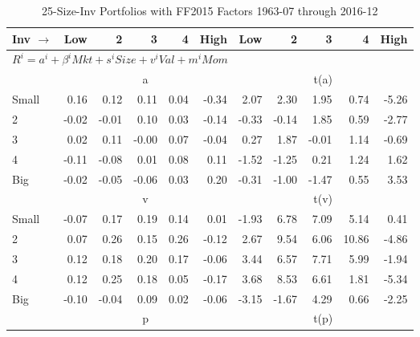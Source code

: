 
\begin{table}[!ht]
\centering
\caption{25-Size-Inv Portfolios with FF2015 Factors 1963-07 through 2016-12}
\begin{tabular}{lrrrrrrrrrr}
  \toprule
    Inv $\rightarrow$ & Low & 2 & 3 & 4 & High & Low & 2 & 3 & 4 & High \\ 
  \midrule
  \multicolumn{11}{l}{$R^i=a^i+\beta^iMkt+s^iSize+v^iVal+m^iMom$} \\

  
    
      & \multicolumn{5}{c}{a} & \multicolumn{5}{c}{t(a)}
    
    \\
      \cmidrule(r){2-6} \cmidrule(r){7-11}

    Small   & 0.16  & 0.12  & 0.11  & 0.04  & -0.34  & 2.07  & 2.30  & 1.95  & 0.74  & -5.26  \\
         2  & -0.02  & -0.01  & 0.10  & 0.03  & -0.14  & -0.33  & -0.14  & 1.85  & 0.59  & -2.77  \\
         3  & 0.02  & 0.11  & -0.00  & 0.07  & -0.04  & 0.27  & 1.87  & -0.01  & 1.14  & -0.69  \\
         4  & -0.11  & -0.08  & 0.01  & 0.08  & 0.11  & -1.52  & -1.25  & 0.21  & 1.24  & 1.62  \\
    Big     & -0.02  & -0.05  & -0.06  & 0.03  & 0.20  & -0.31  & -1.00  & -1.47  & 0.55  & 3.53  \\

  
    
      & \multicolumn{5}{c}{v} & \multicolumn{5}{c}{t(v)}
    
    \\
      \cmidrule(r){2-6} \cmidrule(r){7-11}

    Small   & -0.07  & 0.17  & 0.19  & 0.14  & 0.01  & -1.93  & 6.78  & 7.09  & 5.14  & 0.41  \\
         2  & 0.07  & 0.26  & 0.15  & 0.26  & -0.12  & 2.67  & 9.54  & 6.06  & 10.86  & -4.86  \\
         3  & 0.12  & 0.18  & 0.20  & 0.17  & -0.06  & 3.44  & 6.57  & 7.71  & 5.99  & -1.94  \\
         4  & 0.12  & 0.25  & 0.18  & 0.05  & -0.17  & 3.68  & 8.53  & 6.61  & 1.81  & -5.34  \\
    Big     & -0.10  & -0.04  & 0.09  & 0.02  & -0.06  & -3.15  & -1.67  & 4.29  & 0.66  & -2.25  \\

  
    
      & \multicolumn{5}{c}{p} & \multicolumn{5}{c}{t(p)}
    

\end{tabular}
\end{table}
